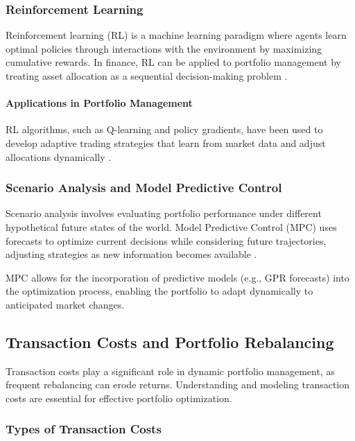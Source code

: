 \subsubsection{Reinforcement Learning}

Reinforcement learning (RL) is a machine learning paradigm where agents learn optimal policies through interactions with the environment by maximizing cumulative rewards. In finance, RL can be applied to portfolio management by treating asset allocation as a sequential decision-making problem \cite{moody1998performance}.

\paragraph{Applications in Portfolio Management}

RL algorithms, such as Q-learning and policy gradients, have been used to develop adaptive trading strategies that learn from market data and adjust allocations dynamically \cite{almahdi2019adaptive}.

\subsubsection{Scenario Analysis and Model Predictive Control}

Scenario analysis involves evaluating portfolio performance under different hypothetical future states of the world. Model Predictive Control (MPC) uses forecasts to optimize current decisions while considering future trajectories, adjusting strategies as new information becomes available \cite{primbs2009dynamic}.


MPC allows for the incorporation of predictive models (e.g., \ac{GPR} forecasts) into the optimization process, enabling the portfolio to adapt dynamically to anticipated market changes.

\subsection{Transaction Costs and Portfolio Rebalancing}

Transaction costs play a significant role in dynamic portfolio management, as frequent rebalancing can erode returns. Understanding and modeling transaction costs are essential for effective portfolio optimization.

\subsubsection{Types of Transaction Costs}

